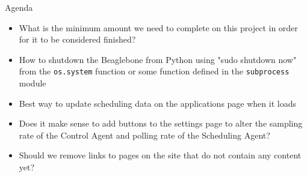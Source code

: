 \documentclass[fontsize=11pt, %
                             paper=letter, %
                             openany, %
                             captions=tableheading,
                             index=totoc,
                             hyperref]{labbook}
\begin{document}
Agenda
\begin{itemize}
\item What is the minimum amount we need to complete on this project in order for it to be considered finished?
\item How to shutdown the Beaglebone from Python using "sudo shutdown now" from the \texttt{os.system} function or some function defined in the \texttt{subprocess} module
\item Best way to update scheduling data on the applications page when it loads
\item Does it make sense to add buttons to the settings page to alter the sampling rate of the Control Agent and polling rate of the Scheduling Agent?
\item Should we remove links to pages on the site that do not contain any content yet?
\end{itemize}
\end{document}
